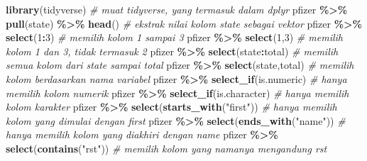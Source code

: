 \documentclass[
]{book}
\newenvironment{Shaded}{\begin{snugshade}}{\end{snugshade}}
\newcommand{\CommentTok}[1]{\textcolor[rgb]{0.56,0.35,0.01}{\textit{#1}}}
\newcommand{\DecValTok}[1]{\textcolor[rgb]{0.00,0.00,0.81}{#1}}
\newcommand{\FunctionTok}[1]{\textcolor[rgb]{0.13,0.29,0.53}{\textbf{#1}}}
\newcommand{\NormalTok}[1]{#1}
\newcommand{\SpecialCharTok}[1]{\textcolor[rgb]{0.81,0.36,0.00}{\textbf{#1}}}
\newcommand{\StringTok}[1]{\textcolor[rgb]{0.31,0.60,0.02}{#1}}
\begin{document}
\begin{Shaded}
\begin{Highlighting}[]
\FunctionTok{library}\NormalTok{(tidyverse)                                }\CommentTok{\# muat \textasciigrave{}tidyverse\textasciigrave{}, yang termasuk dalam \textasciigrave{}dplyr\textasciigrave{}}
\NormalTok{pfizer }\SpecialCharTok{\%\textgreater{}\%} \FunctionTok{pull}\NormalTok{(state) }\SpecialCharTok{\%\textgreater{}\%} \FunctionTok{head}\NormalTok{()                 }\CommentTok{\# ekstrak nilai kolom \textasciigrave{}state\textasciigrave{} sebagai vektor}
\NormalTok{pfizer }\SpecialCharTok{\%\textgreater{}\%} \FunctionTok{select}\NormalTok{(}\DecValTok{1}\SpecialCharTok{:}\DecValTok{3}\NormalTok{)                            }\CommentTok{\# memilih kolom 1 sampai 3}
\NormalTok{pfizer }\SpecialCharTok{\%\textgreater{}\%} \FunctionTok{select}\NormalTok{(}\DecValTok{1}\NormalTok{,}\DecValTok{3}\NormalTok{)                            }\CommentTok{\# memilih kolom 1 dan 3, tidak termasuk 2}
\NormalTok{pfizer }\SpecialCharTok{\%\textgreater{}\%} \FunctionTok{select}\NormalTok{(state}\SpecialCharTok{:}\NormalTok{total)                    }\CommentTok{\# memilih semua kolom dari \textasciigrave{}state\textasciigrave{} sampai \textasciigrave{}total\textasciigrave{}}
\NormalTok{pfizer }\SpecialCharTok{\%\textgreater{}\%} \FunctionTok{select}\NormalTok{(state,total)                    }\CommentTok{\# memilih kolom berdasarkan nama variabel}
\NormalTok{pfizer }\SpecialCharTok{\%\textgreater{}\%} \FunctionTok{select\_if}\NormalTok{(is.numeric)                  }\CommentTok{\# hanya memilih kolom numerik}
\NormalTok{pfizer }\SpecialCharTok{\%\textgreater{}\%} \FunctionTok{select\_if}\NormalTok{(is.character)                }\CommentTok{\# hanya memilih kolom karakter}
\NormalTok{pfizer }\SpecialCharTok{\%\textgreater{}\%} \FunctionTok{select}\NormalTok{(}\FunctionTok{starts\_with}\NormalTok{(}\StringTok{"first"}\NormalTok{))           }\CommentTok{\# hanya memilih kolom yang dimulai dengan \textasciigrave{}first\textasciigrave{}}
\NormalTok{pfizer }\SpecialCharTok{\%\textgreater{}\%} \FunctionTok{select}\NormalTok{(}\FunctionTok{ends\_with}\NormalTok{(}\StringTok{"name"}\NormalTok{))              }\CommentTok{\# hanya memilih kolom yang diakhiri dengan \textasciigrave{}name\textasciigrave{}}
\NormalTok{pfizer }\SpecialCharTok{\%\textgreater{}\%} \FunctionTok{select}\NormalTok{(}\FunctionTok{contains}\NormalTok{(}\StringTok{"rst"}\NormalTok{))                }\CommentTok{\# memilih kolom yang namanya mengandung \textasciigrave{}rst\textasciigrave{}}

\end{Highlighting}
\end{Shaded}
\end{document}
